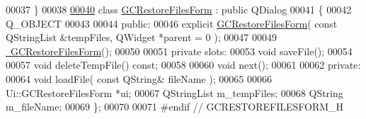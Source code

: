 \begin{DoxyCode}
00037 \}
00038 
\hypertarget{gcrestorefilesform_8h_source_l00040}{}\hyperlink{class_g_c_restore_files_form}{00040} \textcolor{keyword}{class }\hyperlink{class_g_c_restore_files_form}{GCRestoreFilesForm} : \textcolor{keyword}{public} QDialog
00041 \{
00042   Q\_OBJECT
00043   
00044 \textcolor{keyword}{public}:
00046   \textcolor{keyword}{explicit} \hyperlink{class_g_c_restore_files_form_a0b736b8d4da5adb072e32ea188526634}{GCRestoreFilesForm}( \textcolor{keyword}{const} QStringList &tempFiles, QWidget *parent = 
      0 );
00047 
00049   \hyperlink{class_g_c_restore_files_form_a69ec217c50d53d5cb0cfbf7b7da56936}{~GCRestoreFilesForm}();
00050   
00051 \textcolor{keyword}{private} slots:
00053   \textcolor{keywordtype}{void} saveFile();
00054 
00057   \textcolor{keywordtype}{void} deleteTempFile() \textcolor{keyword}{const};
00058 
00060   \textcolor{keywordtype}{void} next();
00061 
00062 \textcolor{keyword}{private}:
00064   \textcolor{keywordtype}{void} loadFile( \textcolor{keyword}{const} QString& fileName );
00065 
00066   Ui::GCRestoreFilesForm *ui;
00067   QStringList m\_tempFiles;
00068   QString     m\_fileName;
00069 \};
00070 
00071 \textcolor{preprocessor}{#endif // GCRESTOREFILESFORM\_H}
\end{DoxyCode}
